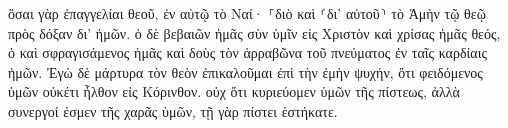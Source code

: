 \documentclass{openreader}
\begin{document}
ὅσαι γὰρ ἐπαγγελίαι θεοῦ, ἐν αὐτῷ τὸ Ναί· ⸀διὸ καὶ ⸂δι’ αὐτοῦ⸃ τὸ Ἀμὴν τῷ θεῷ πρὸς δόξαν δι’ ἡμῶν. 
ὁ δὲ βεβαιῶν ἡμᾶς σὺν ὑμῖν εἰς Χριστὸν καὶ χρίσας ἡμᾶς θεός, 
ὁ καὶ σφραγισάμενος ἡμᾶς καὶ δοὺς τὸν ἀρραβῶνα τοῦ πνεύματος ἐν ταῖς καρδίαις ἡμῶν. 
Ἐγὼ δὲ μάρτυρα τὸν θεὸν ἐπικαλοῦμαι ἐπὶ τὴν ἐμὴν ψυχήν, ὅτι φειδόμενος ὑμῶν οὐκέτι ἦλθον εἰς Κόρινθον. 
οὐχ ὅτι κυριεύομεν ὑμῶν τῆς πίστεως, ἀλλὰ συνεργοί ἐσμεν τῆς χαρᾶς ὑμῶν, τῇ γὰρ πίστει ἑστήκατε. 
\end{document}
